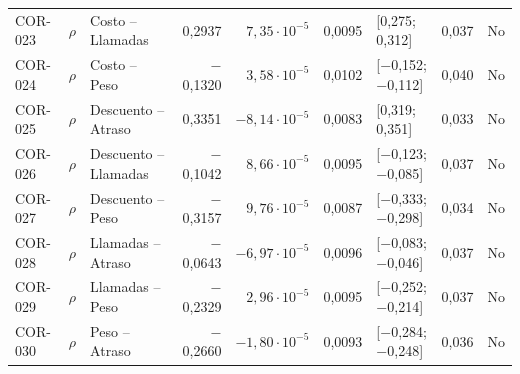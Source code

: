 {\begin{longtable}{@{}l l l r r r l r c@{}}
COR-023 & $\rho$ & Costo -- Llamadas & 0,2937 & $7{,}35\cdot 10^{-5}$ & 0,0095 & [0,275; 0,312] & 0,037 & No\\
COR-024 & $\rho$ & Costo -- Peso & $-$0,1320 & $3{,}58\cdot 10^{-5}$ & 0,0102 & [$-$0,152; $-$0,112] & 0,040 & No\\
COR-025 & $\rho$ & Descuento -- Atraso & 0,3351 & $-8{,}14\cdot 10^{-5}$ & 0,0083 & [0,319; 0,351] & 0,033 & No\\
COR-026 & $\rho$ & Descuento -- Llamadas & $-$0,1042 & $8{,}66\cdot 10^{-5}$ & 0,0095 & [$-$0,123; $-$0,085] & 0,037 & No\\
COR-027 & $\rho$ & Descuento -- Peso & $-$0,3157 & $9{,}76\cdot 10^{-5}$ & 0,0087 & [$-$0,333; $-$0,298] & 0,034 & No\\
COR-028 & $\rho$ & Llamadas -- Atraso & $-$0,0643 & $-6{,}97\cdot 10^{-5}$ & 0,0096 & [$-$0,083; $-$0,046] & 0,037 & No\\
COR-029 & $\rho$ & Llamadas -- Peso & $-$0,2329 & $2{,}96\cdot 10^{-5}$ & 0,0095 & [$-$0,252; $-$0,214] & 0,037 & No\\
COR-030 & $\rho$ & Peso -- Atraso & $-$0,2660 & $-1{,}80\cdot 10^{-5}$ & 0,0093 & [$-$0,284; $-$0,248] & 0,036 & No\\
\end{longtable}}

